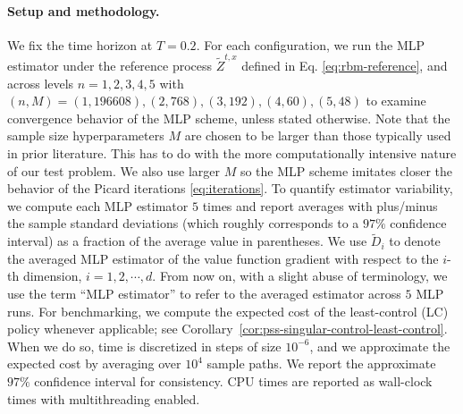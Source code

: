 \documentclass[11pt]{article}
\theoremstyle{definition}
\theoremstyle{plain}
\begin{document}
\paragraph{Setup and methodology.}
We fix the time horizon at $T=0.2$. For each configuration, we run the MLP estimator 
under the reference process $\tilde Z^{t,x}$ defined in Eq. \eqref{eq:rbm-reference}, 
and across levels $n=1,2,3,4,5$ with 
$(n,M) = (1,196608), (2,768), (3,192), (4,60), (5,48)$ to examine convergence behavior of the MLP scheme, unless stated otherwise. 
Note that the sample size hyperparameters $M$ are chosen to be larger than those typically used in prior literature. 
This has to do with the more computationally intensive nature of our test problem. 
We also use larger $M$ so the MLP scheme imitates closer the behavior of the Picard iterations \eqref{eq:iterations}. 
To quantify estimator variability, we compute each MLP estimator $5$ times 
and report averages with plus/minus the sample standard deviations (which roughly corresponds to a $97\%$ confidence interval) 
as a fraction of the average value in parentheses. 
We use $\tilde D_i$ to denote the averaged MLP estimator of the value function gradient with respect to the $i$-th dimension, $i=1,2, \cdots, d$. 
From now on, with a slight abuse of terminology, we use the term ``MLP estimator'' to refer to the averaged estimator across $5$ MLP runs. 
For benchmarking, we compute the expected cost of the least-control (LC) policy whenever applicable; see Corollary~\ref{cor:pss-singular-control-least-control}. 
When we do so, time is discretized in steps of size $10^{-6}$, and we approximate the expected cost by averaging over $10^4$ sample paths. 
We report the approximate $97\%$ confidence interval for consistency. 
CPU times are reported as wall-clock times with multithreading enabled.
\end{document}
